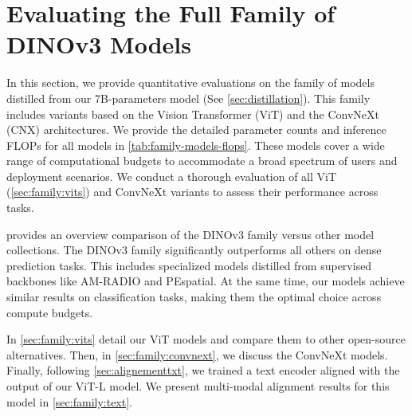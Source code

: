 \section{Evaluating the Full Family of DINOv3 Models}
\label{sec:family}
In this section, we provide quantitative evaluations on the family of models distilled from our 7B-parameters model (See \cref{sec:distillation}). 
This family includes variants based on the Vision Transformer (ViT) and the ConvNeXt (CNX) architectures.
We provide the detailed parameter counts and inference FLOPs for all models in \cref{tab:family-models-flops}. 
These models cover a wide range of computational budgets to accommodate a broad spectrum of users and deployment scenarios. 
We conduct a thorough evaluation of all ViT (\cref{sec:family:vits}) and ConvNeXt variants to assess their performance across tasks.

 provides an overview comparison of the DINOv3 family versus other model collections.
The DINOv3 family significantly outperforms all others on dense prediction tasks.
This includes specialized models distilled from supervised backbones like AM-RADIO and PEspatial.
At the same time, our models achieve similar results on classification tasks, making them the optimal choice across compute budgets.

In \cref{sec:family:vits} detail our ViT models and compare them to other open-source alternatives.
Then, in \cref{sec:family:convnext}, we discuss the ConvNeXt models.
Finally, following \cref{sec:alignementtxt}, we trained a text encoder aligned with the output of our ViT-L model.
We present multi-modal alignment results for this model in \cref{sec:family:text}. 



